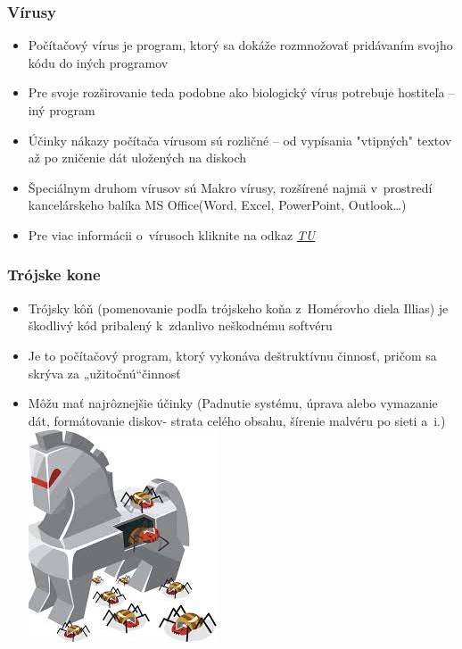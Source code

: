 \documentclass{beamer}
\begin{document}
\begin{frame}
\frametitle{Vírusy}
\begin{itemize}
\item{Počítačový vírus je program, ktorý sa dokáže rozmnožovať pridávaním svojho kódu do iných programov
}
\item{Pre svoje rozširovanie teda podobne ako biologický vírus potrebuje hostiteľa – iný program
}
\item{Účinky nákazy počítača vírusom sú rozličné -- od vypísania "vtipných" textov až po zničenie dát uložených na diskoch
}
\item{Špeciálnym druhom vírusov sú Makro vírusy, rozšírené najmä v~prostredí kancelárskeho balíka MS Office(Word, Excel, PowerPoint, Outlook…)
}
\item{Pre viac informácii o~vírusoch kliknite na odkaz  \href{https://sk.wikipedia.org/wiki/Malware}{\textit{TU}}
}
\end{itemize}
\end{frame}

\begin{frame}
\frametitle{Trójske kone}
\begin{itemize}
\item{Trójsky kôň (pomenovanie podľa trójskeho koňa z~Homérovho diela Illias) je škodlivý kód pribalený k~zdanlivo neškodnému softvéru
}
\item{Je to počítačový program, ktorý vykonáva deštruktívnu činnosť, pričom sa skrýva za „užitočnú“činnosť 
}
\item{Môžu mať najrôznejšie účinky (Padnutie systému, úprava alebo vymazanie dát, formátovanie diskov- strata celého obsahu, šírenie malvéru po sieti a~i.)
}
\vfill
\hspace{50mm}
\includegraphics[scale=0.35]{malware_trojan_horse.jpg}
\end{itemize}
\end{frame}
\end{document}
